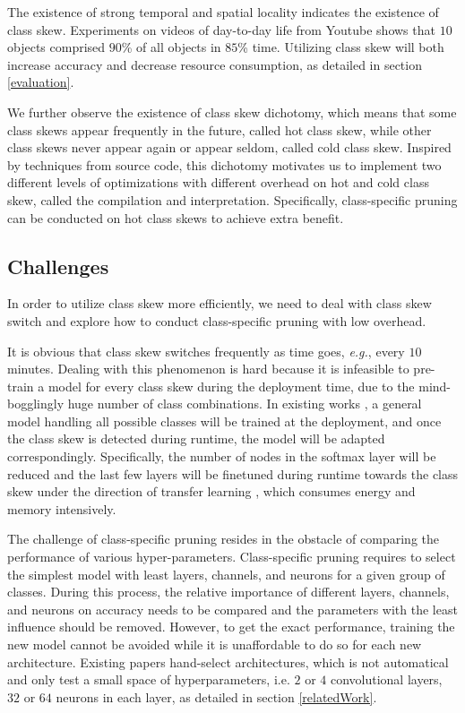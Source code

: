 \documentclass[pageno]{jpaper}
\begin{document}
The existence of strong temporal and spatial locality indicates the existence of class skew. Experiments on videos of day-to-day life from Youtube \cite{shen2016fast} shows that $10$ objects comprised $90$\% of all objects in $85$\% time. Utilizing class skew will both increase accuracy and decrease resource consumption, as detailed in section \ref{evaluation}. 

We further observe the existence of class skew dichotomy, which means that some class skews appear frequently in the future, called hot class skew, while other class skews never appear again or appear seldom, called cold class skew. Inspired by techniques from source code, this dichotomy motivates us to implement two different levels of optimizations with different overhead on hot and cold class skew, called the compilation and interpretation. Specifically, class-specific pruning can be conducted on hot class skews to achieve extra benefit.


\subsection{Challenges}
In order to utilize class skew more efficiently, we need to deal with class skew switch and explore how to conduct class-specific pruning with low overhead. 

It is obvious that class skew switches frequently as time goes, \textit{e.g.}, every $10$ minutes. Dealing with this phenomenon is hard because it is infeasible to pre-train a model for every class skew during the deployment time, due to the mind-bogglingly huge number of class combinations. In existing works \cite{han2016mcdnn, shen2016fast}, a general model handling all possible classes will be trained at the deployment, and once the class skew is detected during runtime, the model will be adapted correspondingly. Specifically, the number of nodes in the softmax layer will be reduced and the last few layers will be finetuned during runtime towards the class skew under the direction of transfer learning \cite{doersch2015unsupervised, noroozi2016unsupervised, oquab2014learning, yosinski2014transferable}, which consumes energy and memory intensively. 

The challenge of class-specific pruning resides in the obstacle of comparing the performance of various hyper-parameters. Class-specific pruning requires to select the simplest model with least layers, channels, and neurons for a given group of classes. During this process, the relative importance of different layers, channels, and neurons on accuracy needs to be compared and the parameters with the least influence should be removed. However, to get the exact performance, training the new model cannot be avoided while it is unaffordable to do so for each new architecture. Existing papers hand-select architectures, which is not automatical and only test a small space of hyperparameters, i.e. $2$ or $4$ convolutional layers, $32$ or $64$ neurons in each layer, as detailed in section \ref{relatedWork}.
\end{document}
